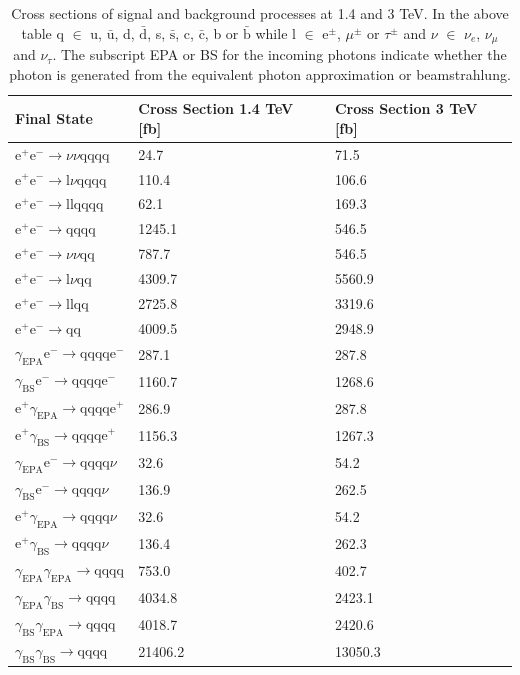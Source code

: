 \begin{table}[h!]
\centering
\begin{tabular}{ l l l}
\hline
Final State & Cross Section 1.4 TeV [fb] & Cross Section 3 TeV [fb]  \\ 
\hline
$\text{e}^{+}\text{e}^{-} \rightarrow \nu{\nu}\text{qqqq}$ & 24.7 & 71.5 \\
$\text{e}^{+}\text{e}^{-} \rightarrow \text{l}\nu\text{qqqq}$ & 110.4 & 106.6 \\
$\text{e}^{+}\text{e}^{-} \rightarrow \text{llqqqq}$ & 62.1 & 169.3 \\
$\text{e}^{+}\text{e}^{-} \rightarrow \text{qqqq}$ & 1245.1 & 546.5 \\
$\text{e}^{+}\text{e}^{-} \rightarrow \nu{\nu}\text{qq}$ & 787.7 & 546.5 \\
$\text{e}^{+}\text{e}^{-} \rightarrow \text{l}\nu\text{qq}$ & 4309.7 & 5560.9 \\
$\text{e}^{+}\text{e}^{-} \rightarrow \text{llqq}$ & 2725.8 & 3319.6 \\
$\text{e}^{+}\text{e}^{-} \rightarrow \text{qq}$ & 4009.5 & 2948.9 \\
$\gamma_{\text{EPA}}\text{e}^{-} \rightarrow \text{qqqq}\text{e}^{-}$ & 287.1 & 287.8 \\
$\gamma_{\text{BS}}\text{e}^{-} \rightarrow \text{qqqq}\text{e}^{-}$ & 1160.7 & 1268.6 \\
$\text{e}^{+}\gamma_{\text{EPA}} \rightarrow \text{qqqq}\text{e}^{+}$ & 286.9 & 287.8 \\
$\text{e}^{+}\gamma_{\text{BS}} \rightarrow \text{qqqq}\text{e}^{+}$ & 1156.3 & 1267.3 \\
$\gamma_{\text{EPA}}\text{e}^{-} \rightarrow \text{qqqq}\nu$ & 32.6 & 54.2 \\
$\gamma_{\text{BS}}\text{e}^{-} \rightarrow \text{qqqq}\nu$ & 136.9 & 262.5 \\
$\text{e}^{+}\gamma_{\text{EPA}} \rightarrow \text{qqqq}\nu$ & 32.6 & 54.2 \\
$\text{e}^{+}\gamma_{\text{BS}} \rightarrow \text{qqqq}\nu$ & 136.4 & 262.3 \\
$\gamma_{\text{EPA}}\gamma_{\text{EPA}} \rightarrow \text{qqqq}$ & 753.0 & 402.7 \\
$\gamma_{\text{EPA}}\gamma_{\text{BS}} \rightarrow \text{qqqq}$ & 4034.8 & 2423.1 \\
$\gamma_{\text{BS}}\gamma_{\text{EPA}} \rightarrow \text{qqqq}$ & 4018.7 & 2420.6 \\
$\gamma_{\text{BS}}\gamma_{\text{BS}} \rightarrow \text{qqqq}$ & 21406.2 & 13050.3 \\
\hline
\end{tabular}
\caption[]{Cross sections of signal and background processes at 1.4 and 3 TeV. In the above table q $\in$ u, $\bar{\text{u}}$, d, $\bar{\text{d}}$, s, $\bar{\text{s}}$, c, $\bar{\text{c}}$, b or $\bar{\text{b}}$ while l $\in$ $\text{e}^{\pm}$, $\mu^{\pm}$ or $\tau^{\pm}$ and $\nu$ $\in$ $\nu_{e}$, $\nu_{\mu}$ and $\nu_{\tau}$.  The subscript EPA or BS for the incoming photons indicate whether the photon is generated from the equivalent photon approximation or beamstrahlung.}
\label{table:crosssectionfull}
\end{table}

